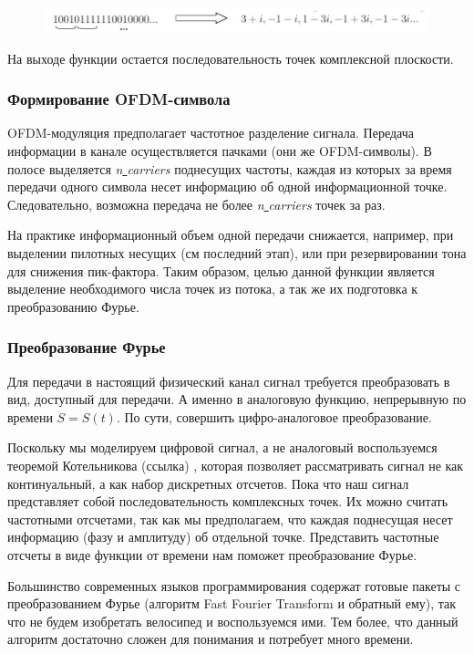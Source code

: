 \begin{figure}[H]
\centering
\includegraphics[width=1\textwidth]{schem2}
\end{figure}
 
 На выходе функции остается последовательность точек комплексной плоскости. 

\subsubsection*{Формирование OFDM-символа}

OFDM-модуляция предполагает частотное разделение сигнала. 
Передача информации в канале осуществляется пачками (они же OFDM-символы). 
В полосе выделяется  \textit{n\underline{ }carriers} поднесущих частоты, каждая из которых за время передачи одного символа несет информацию об одной информационной точке.
Следовательно, возможна передача не более  \textit{n\underline{ }carriers} точек за раз. 

На практике информационный объем одной передачи снижается, например, при выделении пилотных несущих (см последний этап), или при резервировании тона для снижения пик-фактора. 
Таким образом, целью данной функции является выделение необходимого числа точек из потока, а так же их подготовка к преобразованию Фурье. 
 
\subsubsection*{Преобразование Фурье}
 
Для передачи в настоящий физический канал сигнал требуется преобразовать в вид, доступный для передачи. 
А именно в аналоговую функцию, непрерывную по времени $S = S(t)$. 
По сути, совершить цифро-аналоговое преобразование. 

Поскольку мы моделируем цифровой сигнал, а не аналоговый 
воспользуемся теоремой Котельникова  (ссылка)
, которая позволяет рассматривать сигнал не как континуальный, а как набор дискретных отсчетов. 
Пока что наш сигнал представляет собой последовательность комплексных точек. 
Их можно считать частотными отсчетами, так как мы предполагаем, что каждая поднесущая несет информацию (фазу и амплитуду) об отдельной точке.  
Представить частотные отсчеты в виде функции от времени нам поможет преобразование Фурье.

Большинство современных языков программирования содержат готовые пакеты с преобразованием Фурье (алгоритм  Fast Fourier Transform и обратный ему), так что не будем изобретать велосипед и воспользуемся ими.
Тем более, что данный алгоритм достаточно сложен для понимания и потребует много времени. 

